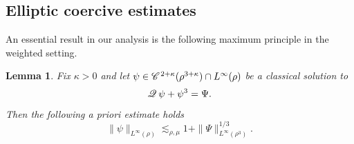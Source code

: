 \documentclass[a4paper,11pt]{article}
\newtheorem{lemma}[theorem]{Lemma}
\numberwithin{equation}{section}
\newcommand{\CC}{\mathscr{C} \hspace{.1em}}
\newcommand{\Q}{\mathscr{Q} \hspace{.2em}}
\newcommand{\8}{\infty}
\begin{document}
\subsection{Elliptic coercive estimates}
\label{s:ell2}

An essential result in our analysis is the following maximum principle in the weighted setting.

\begin{lemma}
  \label{lemma:apriori-elliptic}
  Fix $\kappa > 0$ and let $\psi \in \CC^{2 +
  \kappa} (\rho^{3 + \kappa}) \cap L^{\infty} (\rho)$ be a classical solution
  to
  \[ \Q \psi + \psi^3 = \Psi. \]
  Then the following a priori estimate holds
  \[ \| \psi \|_{L^{\infty} (\rho)} \lesssim_{\rho,\mu} 1 + \| \Psi \|_{L^{\infty}
     (\rho^3)}^{1 / 3}. \]
\end{lemma}
\end{document}
